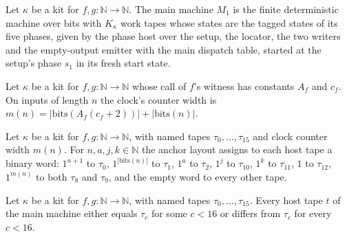 \begin{definition}
\label{Turing.NTimeDiag.qyM₁}
\leanok
{}
Let $\kappa$ be a kit for $f, g : \mathbb{N} \to \mathbb{N}$. The main machine $M_1$ is the finite
deterministic machine over bits with $K_\kappa$ work tapes whose states are the tagged states of
its five phases, given by the phase host over the setup, the locator, the two writers and the
empty-output emitter with the main dispatch table, started at the setup's phase $s_1$ in its fresh
start state.
\end{definition}

\begin{definition}
\label{Turing.NTimeDiag.QyKit.m}
\leanok
{}
Let $\kappa$ be a kit for $f, g : \mathbb{N} \to \mathbb{N}$ whose call of $f$'s witness has
constants $A_f$ and $c_f$. On inputs of length $n$ the clock's counter width is
$m(n) = |\mathrm{bits}(A_f(c_f + 2))| + |\mathrm{bits}(n)|$.
\end{definition}

\begin{definition}
\label{Turing.NTimeDiag.qyLay}
\leanok
{}
Let $\kappa$ be a kit for $f, g : \mathbb{N} \to \mathbb{N}$, with named tapes $\tau_0, \dots,
\tau_{15}$ and clock counter width $m(n)$. For $n, a, j, k \in \mathbb{N}$ the anchor layout
assigns to each host tape a binary word: $1^{n+1}$ to $\tau_0$, $1^{|\mathrm{bits}(n)|}$ to
$\tau_1$, $1^a$ to $\tau_2$, $1^j$ to $\tau_{10}$, $1^k$ to $\tau_{11}$, $1$ to $\tau_{12}$,
$1^{m(n)}$ to both $\tau_8$ and $\tau_9$, and the empty word to every other tape.
\end{definition}

\begin{theorem}
\label{Turing.NTimeDiag.QyKit.tape_cases}
\leanok
{}
Let $\kappa$ be a kit for $f, g : \mathbb{N} \to \mathbb{N}$, with named tapes $\tau_0, \dots,
\tau_{15}$. Every host tape $t$ of the main machine either equals $\tau_c$ for some $c < 16$ or
differs from $\tau_c$ for every $c < 16$.
\end{theorem}

